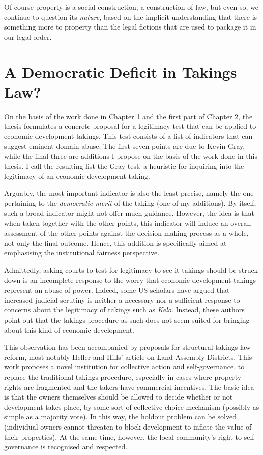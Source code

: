{Of course property is a social construction, a construction of law, but even so, we continue to question its {\it nature}, based on the implicit understanding that there is something more to property than the legal fictions that are used to package it in our legal order.
}

\section{A Democratic Deficit in Takings Law?}


On the basis of the work done in Chapter 1 and the first part of Chapter 2, the thesis formulates a concrete proposal for a legitimacy test that can be applied to economic development takings. This test consists of a list of indicators that can suggest eminent domain abuse. The first seven points are due to Kevin Gray, while the final three are additions I propose on the basis of the work done in this thesis. I call the resulting list the Gray test, a heuristic for inquiring into the legitimacy of an economic development taking.

Arguably, the most important indicator is also the least precise, namely the one pertaining to the {\it democratic merit} of the taking (one of my additions). By itself, such a broad indicator might not offer much guidance. However, the idea is that when taken together with the other points, this indicator will induce an overall assessment of the other points against the decision-making process as a whole, not only the final outcome. Hence, this addition is specifically aimed at emphasising the institutional fairness perspective.

Admittedly, asking courts to test for legitimacy to see it takings should be struck down is an incomplete response to the worry that economic development takings represent an abuse of power. Indeed, some US scholars have argued that increased judicial scrutiny is neither a necessary nor a sufficient response to concerns about the legitimacy of takings such as {\it Kelo}. Instead, these authors point out that the takings procedure as such does not seem suited for bringing about this kind of economic development.

This observation has been accompanied by proposals for structural takings law reform, most notably Heller and Hills' article on Land Assembly Districts. This work proposes a novel institution for collective action and self-governance, to replace the traditional takings procedure, especially in cases where property rights are fragmented and the takers have commercial incentives. The basic idea is that the owners themselves should be allowed to decide whether or not development takes place, by some sort of collective choice mechanism (possibly as simple as a majority vote). In this way, the holdout problem can be solved (individual owners cannot threaten to block development to inflate the value of their properties). At the same time, however, the local community's right to self-governance is recognised and respected.
 
